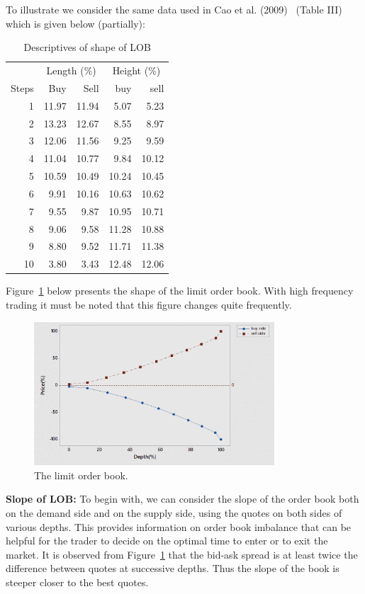 To illustrate we consider the same data used in Cao et al. (2009)~\cite{caohanschwang} (Table III) which is given below (partially):
	\begin{table}[!ht]
	\centering
	\caption{Descriptives of shape of LOB\label{tab:descLOB}}
	\begin{tabular}{rrrrr}
	& \multicolumn{2}{c}{Length (\%)} & \multicolumn{2}{c}{Height (\%)} \\
	Steps & Buy & Sell & buy & sell \\
	1 & 11.97 & 11.94 & 5.07 & 5.23 \\
	2 & 13.23 & 12.67 & 8.55 & 8.97 \\
	3 & 12.06 & 11.56 & 9.25 & 9.59 \\
	4 & 11.04 & 10.77 & 9.84 & 10.12 \\
	5 & 10.59 & 10.49 & 10.24 & 10.45 \\
	6 & 9.91 & 10.16 & 10.63 & 10.62 \\
	7 & 9.55 & 9.87 & 10.95 & 10.71 \\
	8 & 9.06 & 9.58 & 11.28 & 10.88 \\
	9 & 8.80 & 9.52 & 11.71 & 11.38 \\
	10 & 3.80 & 3.43 & 12.48 & 12.06
	\end{tabular}
	\end{table}

Figure~\ref{fig:presentshape} below presents the shape of the limit order book. With high frequency trading it must be noted that this figure changes quite frequently. 
	\begin{figure}[H]
	\centering
	\includegraphics[width=0.8\textwidth]{chapters/chapter_trade_data_models/figures/lobshape.png} 
	\caption{The limit order book.\label{fig:presentshape}}
	\end{figure}


\noindent \textbf{Slope of LOB:} To begin with, we can consider the slope of the order book both on the demand side and on the supply side, using the quotes on both sides of various depths. This provides information on order book imbalance that can be helpful for the trader to decide on the optimal time to enter or to exit the market. It is observed from Figure~\ref{fig:presentshape} that the bid-ask spread is at least twice the difference between quotes at successive depths. Thus the slope of the book is steeper closer to the best quotes. \twomedskip


